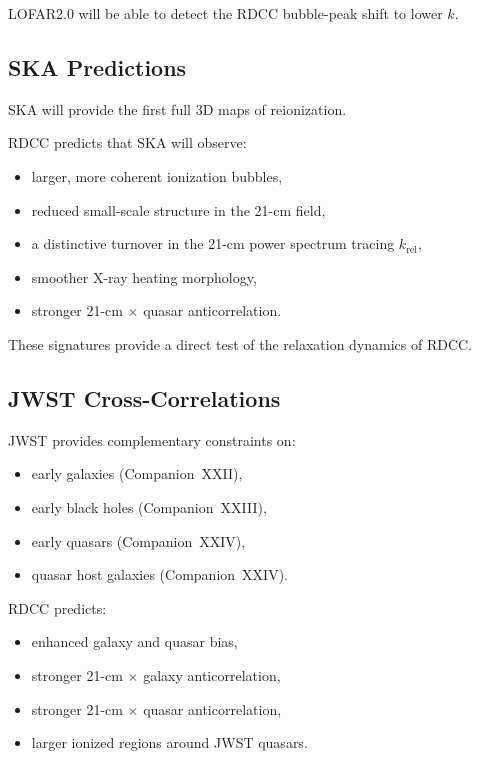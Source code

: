 \documentclass[11pt,a4paper]{article}
\begin{document}
LOFAR2.0 will be able to detect the RDCC bubble-peak shift to lower $k$.

\subsection{SKA Predictions}

SKA will provide the first full 3D maps of reionization.

RDCC predicts that SKA will observe:
\begin{itemize}
\item larger, more coherent ionization bubbles,
\item reduced small-scale structure in the 21-cm field,
\item a distinctive turnover in the 21-cm power spectrum tracing $k_{\mathrm{rel}}$,
\item smoother X-ray heating morphology,
\item stronger 21-cm $\times$ quasar anticorrelation.
\end{itemize}

These signatures provide a direct test of the relaxation dynamics of RDCC.

\subsection{JWST Cross-Correlations}

JWST provides complementary constraints on:
\begin{itemize}
\item early galaxies (Companion~XXII),
\item early black holes (Companion~XXIII),
\item early quasars (Companion~XXIV),
\item quasar host galaxies (Companion~XXIV).
\end{itemize}

RDCC predicts:
\begin{itemize}
\item enhanced galaxy and quasar bias,
\item stronger 21-cm $\times$ galaxy anticorrelation,
\item stronger 21-cm $\times$ quasar anticorrelation,
\item larger ionized regions around JWST quasars.
\end{itemize}
\end{document}
